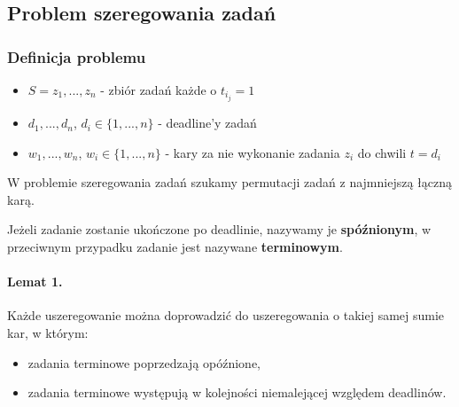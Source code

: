 \subsection{Problem szeregowania zadań}
\subsubsection{Definicja problemu}
\begin{itemize}
\item $S = {z_1, ... ,z_n}$ - zbiór zadań każde o $t_{i_j}=1$ 
\item $d_1, ... , d_n$,  $d_i \in \{1,...,n\}$ - deadline'y zadań 
\item $w_1, ... , w_n$, $w_i \in \{1,...,n\}$ - kary za nie wykonanie zadania $z_i$ do chwili $t=d_i$
\end{itemize}
W problemie szeregowania zadań szukamy permutacji zadań z najmniejszą łączną karą. 

Jeżeli zadanie zostanie ukończone po deadlinie, nazywamy je \textbf{spóźnionym}, w przeciwnym przypadku zadanie jest nazywane \textbf{terminowym}. 

\paragraph{Lemat 1.}{Każde uszeregowanie można doprowadzić do uszeregowania o takiej samej sumie kar, w którym:}
\begin{itemize}
	\item zadania terminowe poprzedzają opóźnione,
	\item zadania terminowe występują w kolejności niemalejącej względem deadlinów.
\end{itemize}  

